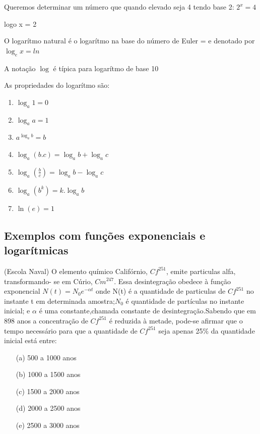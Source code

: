 \begin{multicols*}{2}
            Queremos determinar um número que quando elevado seja 4 tendo base 2: $2^x = 4$
            
            logo x = 2
            
            O logarítmo natural é o logarítmo na base do número de Euler = e denotado por $\log_e x = ln$
            
            A notação $\log$ é típica para logarítmo de base 10
            
            As propriedades do logarítmo são:
            
            \begin{enumerate}
            \item $\log_a 1 = 0$
            \item $\log_a a = 1$
            \item $a^{\log_a b} = b$
            \item $\log_a (b.c) = \log_a b + \log_a c$
            \item $\log_a \left( \frac{b}{c} \right) = \log_a b - \log_a c$
            \item $\log_a (b^k) = k.\log_a b$
            \item $\ln(e) = 1$
            
            \end{enumerate}
            
            
            \subsection*{Exemplos com funções exponenciais e logarítmicas}
            
            (Escola Naval) O elemento químico Califórnio, $Cf^{251}$, emite particulas alfa, transformando-			se em Cúrio, $Cm^{247}$. Essa desintegração obedece à função exponencial $N(t) = N_0 e^{ - 				\alpha t}$ onde N(t) é a quantidade de particulas de $Cf^{251}$ no instante t em determinada 			amostra;$N_0$ é quantidade de partículas no instante inicial; e $\alpha$ é uma 							constante,chamada constante  de desintegração.Sabendo que em 898 anos a concentração de 				$Cf^{251}$ é reduzida à metade, pode-se afirmar que o tempo necessário para que a
            quantidade de $Cf^{251}$ seja apenas 25\% da quantidade inicial está entre:
            
            \begin{itemize}
            \item[(a)] 500 a 1000 anos
            \item[(b)] 1000 a 1500 anos
            \item[(c)] 1500 a 2000 anos 
            \item[(d)] 2000 a 2500 anos 
            \item[(e)] 2500 a 3000 anos
            \end{itemize}
    

\end{multicols*}
